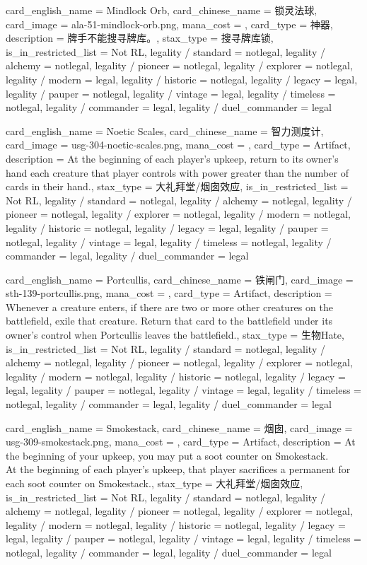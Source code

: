 \documentclass[lang = cn, color = black, 10pt]{AllThatStax}
\begin{document}
\card
{
	card_english_name = {Mindlock Orb},
	card_chinese_name = {锁灵法球},
	card_image = ala-51-mindlock-orb.png,
	mana_cost = ,
	card_type = 神器,
	description = {牌手不能搜寻牌库。},
	stax_type = 搜寻牌库锁,
	is_in_restricted_list = Not RL,
	legality / standard = notlegal,
	legality / alchemy = notlegal,
	legality / pioneer = notlegal,
	legality / explorer = notlegal,
	legality / modern = legal,
	legality / historic = notlegal,
	legality / legacy = legal,
	legality / pauper = notlegal,
	legality / vintage = legal,
	legality / timeless = notlegal,
	legality / commander = legal,
	legality / duel_commander = legal
}

\card
{
	card_english_name = {Noetic Scales},
	card_chinese_name = {智力测度计},
	card_image = usg-304-noetic-scales.png,
	mana_cost = ,
	card_type = Artifact,
	description = {At the beginning of each player's upkeep, return to its owner's hand each creature that player controls with power greater than the number of cards in their hand.},
	stax_type = 大礼拜堂/烟囱效应,
	is_in_restricted_list = Not RL,
	legality / standard = notlegal,
	legality / alchemy = notlegal,
	legality / pioneer = notlegal,
	legality / explorer = notlegal,
	legality / modern = notlegal,
	legality / historic = notlegal,
	legality / legacy = legal,
	legality / pauper = notlegal,
	legality / vintage = legal,
	legality / timeless = notlegal,
	legality / commander = legal,
	legality / duel_commander = legal
}

\card
{
	card_english_name = {Portcullis},
	card_chinese_name = {铁闸门},
	card_image = sth-139-portcullis.png,
	mana_cost = ,
	card_type = Artifact,
	description = {Whenever a creature enters, if there are two or more other creatures on the battlefield, exile that creature. Return that card to the battlefield under its owner's control when Portcullis leaves the battlefield.},
	stax_type = 生物Hate,
	is_in_restricted_list = Not RL,
	legality / standard = notlegal,
	legality / alchemy = notlegal,
	legality / pioneer = notlegal,
	legality / explorer = notlegal,
	legality / modern = notlegal,
	legality / historic = notlegal,
	legality / legacy = legal,
	legality / pauper = notlegal,
	legality / vintage = legal,
	legality / timeless = notlegal,
	legality / commander = legal,
	legality / duel_commander = legal
}

\card
{
	card_english_name = {Smokestack},
	card_chinese_name = {烟囱},
	card_image = usg-309-smokestack.png,
	mana_cost = ,
	card_type = Artifact,
	description = {At the beginning of your upkeep, you may put a soot counter on Smokestack.\\
		At the beginning of each player's upkeep, that player sacrifices a permanent for each soot counter on Smokestack.},
	stax_type = 大礼拜堂/烟囱效应,
	is_in_restricted_list = Not RL,
	legality / standard = notlegal,
	legality / alchemy = notlegal,
	legality / pioneer = notlegal,
	legality / explorer = notlegal,
	legality / modern = notlegal,
	legality / historic = notlegal,
	legality / legacy = legal,
	legality / pauper = notlegal,
	legality / vintage = legal,
	legality / timeless = notlegal,
	legality / commander = legal,
	legality / duel_commander = legal
}
\end{document}

